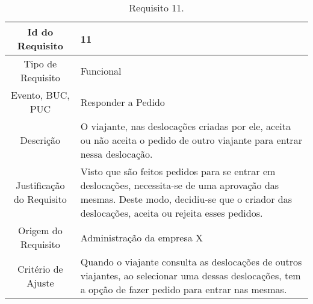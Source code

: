 \begin{table}[H]
\begin{center}
  \begin{tabularx}{\textwidth}{ | c | X | }
    \hline
    Id do Requisito & 11  \\
    
    \hline
    Tipo de Requisito & Funcional \\
    
    \hline
    Evento, BUC, PUC &  Responder a Pedido\\
    
    \hline
    Descrição & O viajante, nas deslocações criadas por ele, aceita ou não aceita o pedido de outro viajante para entrar nessa deslocação. \\
    
    \hline
    Justificação do Requisito & Visto que são feitos pedidos para se entrar em deslocações, necessita-se de uma aprovação das mesmas. Deste modo, decidiu-se que o criador das deslocações, aceita ou rejeita esses pedidos.  \\
    
    \hline
    Origem do Requisito & Administração da empresa X \\
    
    \hline
    Critério de Ajuste & Quando o viajante consulta as deslocações de outros viajantes, ao selecionar uma dessas deslocações, tem a opção de fazer pedido para entrar nas mesmas. \\
    
    \hline
  \end{tabularx}
  \caption{Requisito 11.} \label{tab:r3}
\end{center}
\end{table}

